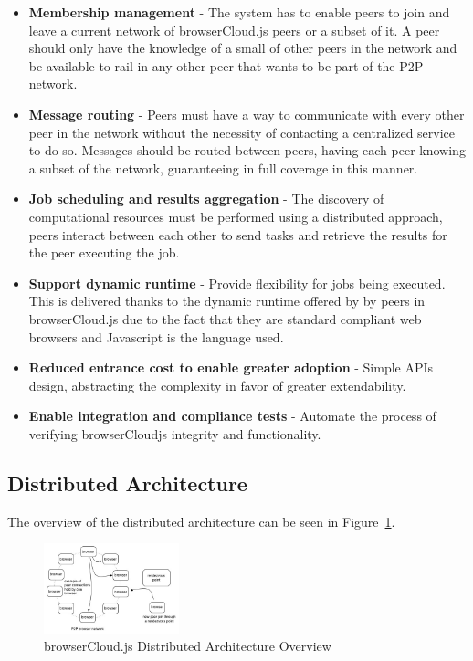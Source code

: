 \begin{itemize}
    \item \textbf{Membership management} - The system has to enable peers to join and leave a current network of browserCloud.js peers or a subset of it. A peer should only have the knowledge of a small of other peers in the network and be available to rail in any other peer that wants to be part of the P2P network.
    \item \textbf{Message routing} - Peers must have a way to communicate with every other peer in the network without the necessity of contacting a centralized service to do so. Messages should be routed between peers, having each peer knowing a subset of the network, guaranteeing in full coverage in this manner.
    \item \textbf{Job scheduling and results aggregation} - The discovery of computational resources must be performed using a distributed approach, peers interact between each other to send tasks and retrieve the results for the peer executing the job.
    \item \textbf{Support dynamic runtime} - Provide flexibility for jobs being executed. This is delivered thanks to the dynamic runtime offered by by peers in browserCloud.js due to the fact that they are standard compliant web browsers and Javascript is the language used.
    \item \textbf{Reduced entrance cost to enable greater adoption} - Simple APIs design, abstracting the complexity in favor of greater extendability.
    \item \textbf{Enable integration and compliance tests} - Automate the process of verifying browserCloudjs integrity and functionality.
\end{itemize}

\subsection{Distributed Architecture}

The overview of the distributed architecture can be seen in Figure~\ref{fig:n-a-o}.

\begin{figure}[h!]
  \centering
  \includegraphics[width=0.35\textwidth]{figs/network-architecture-overview}
  \caption{browserCloud.js Distributed Architecture Overview}
  \label{fig:n-a-o}
\end{figure}

